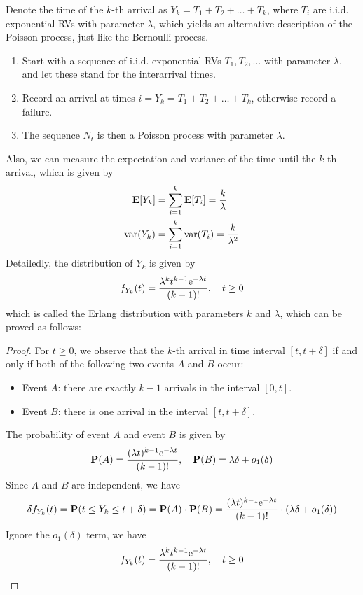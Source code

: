 Denote the time of the $k$-th arrival as $Y_k = T_1 + T_2 + \ldots + T_k$, where $T_i$ are i.i.d. exponential RVs with parameter $\lambda$, which yields an alternative description of the Poisson process, just like the Bernoulli process.
\begin{definition}
    \begin{enumerate}
        \item Start with a sequence of i.i.d. exponential RVs $T_1, T_2, \ldots$ with parameter $\lambda$, and let these stand for the interarrival times.
        \item Record an arrival at times $i = Y_k = T_1 + T_2 + \ldots + T_k$, otherwise record a failure.
        \item The sequence $N_t$ is then a Poisson process with parameter $\lambda$.
    \end{enumerate}
\end{definition}
Also, we can measure the expectation and variance of the time until the $k$-th arrival, which is given by
\begin{align}
    \mathbf{E}\qty[Y_k] &= \sum_{i=1}^{k} \mathbf{E}\qty[T_i] = \frac{k}{\lambda} \\
    \mathrm{var}\qty(Y_k) &= \sum_{i=1}^{k} \mathrm{var}\qty(T_i) = \frac{k}{\lambda^2}
\end{align}
Detailedly, the distribution of $Y_k$ is given by
\begin{equation}
    f_{Y_k}(t) = \frac{\lambda^k t^{k-1} \mathrm{e}^{-\lambda t}}{(k-1)!}, \quad t \geq 0
\end{equation}
which is called the Erlang distribution with parameters $k$ and $\lambda$, which can be proved as follows:
\begin{proof}
    For $t \geq 0$, we observe that the $k$-th arrival in time interval $[t, t + \delta]$ if and only if both of the following two events $A$ and $B$ occur:
    \begin{itemize}
        \item Event $A$: there are exactly $k-1$ arrivals in the interval $[0, t]$.
        \item Event $B$: there is one arrival in the interval $[t, t + \delta]$.
    \end{itemize}
    The probability of event $A$ and event $B$ is given by
    \begin{equation}
        \mathbf{P}(A) = \frac{(\lambda t)^{k-1} \mathrm{e}^{-\lambda t}}{(k-1)!}, \quad \mathbf{P}(B) = \lambda \delta + o_1(\delta)
    \end{equation}
    Since $A$ and $B$ are independent, we have
    \begin{equation}
        \delta f_{Y_k}(t) = \mathbf{P}(t \leq Y_k \leq t + \delta) = \mathbf{P}(A) \cdot \mathbf{P}(B) = \frac{(\lambda t)^{k-1} \mathrm{e}^{-\lambda t}}{(k-1)!} \cdot (\lambda \delta + o_1(\delta))
    \end{equation}
    Ignore the $o_1(\delta)$ term, we have
    \begin{equation}
        f_{Y_k}(t) = \frac{\lambda^k t^{k-1} \mathrm{e}^{-\lambda t}}{(k-1)!}, \quad t \geq 0
    \end{equation}
\end{proof}

